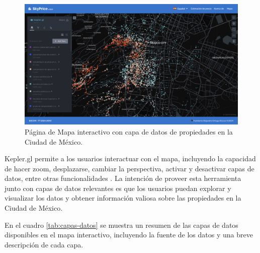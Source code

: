\begin{figure}[H]
    \centering
    \includegraphics[width=1.0\textwidth]{imagenes/05-implementacion/interfaz-grafica/mapa-interactivo-cargado.png}
    \caption{Página de Mapa interactivo con capa de datos de propiedades en la Ciudad de México.}
    \label{fig:mapa-interactivo-cargado}
\end{figure}

Kepler.gl permite a los usuarios interactuar con el mapa, incluyendo la capacidad
de hacer zoom, desplazarse, cambiar la perspectiva, activar y desactivar capas de
datos, entre otras funcionalidades \cite{kepler_gl_docs}. La intención de proveer esta herramienta
junto con capas de datos relevantes es que los usuarios puedan explorar y
visualizar los datos y obtener información valiosa sobre las propiedades en la
Ciudad de México.

En el cuadro \ref{tab:capas-datos} se muestra un resumen de las capas de datos
disponibles en el mapa interactivo, incluyendo la fuente de los datos y una breve
descripción de cada capa.

